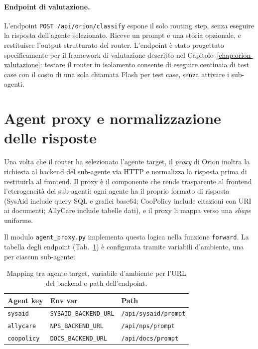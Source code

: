 \paragraph{Endpoint di valutazione.}
\label{subsec:orion-impl-classify}
L'endpoint \texttt{POST /api/orion/classify} espone il solo routing step, senza eseguire la risposta dell'agente selezionato.
Riceve un prompt e una storia opzionale, e restituisce l'output strutturato del router.
L'endpoint è stato progettato specificamente per il framework di valutazione descritto nel Capitolo~\ref{chap:orion-valutazione}:
testare il router in isolamento consente di eseguire centinaia di test case con il costo di una sola chiamata Flash per test case, senza attivare i sub-agenti.

\section{Agent proxy e normalizzazione delle risposte}
\label{sec:orion-proxy}
\label{subsec:orion-impl-proxy}

Una volta che il router ha selezionato l'agente target, il \emph{proxy} di Orion inoltra
la richiesta al backend del sub-agente via HTTP e normalizza la risposta prima di restituirla al frontend.
Il proxy è il componente che rende trasparente al frontend l'eterogeneità dei sub-agenti:
ogni agente ha il proprio formato di risposta (SysAid include query SQL e grafici base64; CooPolicy include citazioni con URI ai documenti; AllyCare include tabelle dati),
e il proxy li mappa verso una \emph{shape} uniforme.

Il modulo \texttt{agent\_proxy.py} implementa questa logica nella funzione
\texttt{forward}. La tabella degli endpoint (Tab.~\ref{tab:agent-endpoints}) è configurata tramite variabili
d'ambiente, una per ciascun sub-agente:

\begin{table}[htbp]
  \centering
  \caption[Mapping degli endpoint dei sub-agenti]{Mapping tra agente target, variabile d'ambiente per l'URL del backend e path dell'endpoint.}
  \label{tab:agent-endpoints}
  \begin{tabular}{lll}
    \toprule
    \textbf{Agent key} & \textbf{Env var}             & \textbf{Path} \\
    \midrule
    \texttt{sysaid}    & \texttt{SYSAID\_BACKEND\_URL} & \texttt{/api/sysaid/prompt} \\
    \texttt{allycare}  & \texttt{NPS\_BACKEND\_URL}    & \texttt{/api/nps/prompt} \\
    \texttt{coopolicy} & \texttt{DOCS\_BACKEND\_URL}   & \texttt{/api/docs/prompt} \\
    \bottomrule
  \end{tabular}
\end{table}

